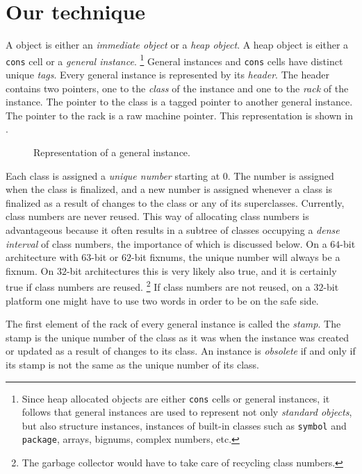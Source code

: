 \section{Our technique}

A \sicl{} object is either an \emph{immediate object} or a \emph{heap
  object}.  A heap object is either a \texttt{cons} cell or a
\emph{general instance}.%
\footnote{Since heap allocated objects are either \texttt{cons} cells
  or general instances, it follows that general instances are used to
  represent not only \emph{standard objects}, but also structure
  instances, instances of built-in classes such as \texttt{symbol} and
  \texttt{package}, arrays, bignums, complex numbers, etc.}
General instances and \texttt{cons} cells have
distinct unique \emph{tags}.  Every general instance is represented by
its \emph{header}.  The header contains two pointers, one to the
\emph{class} of the instance and one to the \emph{rack} of the
instance.  The pointer to the class is a tagged pointer to another
general instance.  The pointer to the rack is a raw machine pointer.
This representation is shown in .

\begin{figure}
\begin{center}
\end{center}
\caption{\label{fig-general-instance}
Representation of a general instance.}
\end{figure}

Each class is assigned a \emph{unique number} starting at $0$.  The
number is assigned when the class is finalized, and a new number is
assigned whenever a class is finalized as a result of changes to the
class or any of its superclasses.  Currently, class numbers are never
reused.  This way of allocating class numbers is advantageous because
it often results in a subtree of classes occupying a \emph{dense
  interval} of class numbers, the importance of which is discussed
below.  On a $64$-bit architecture with $63$-bit or $62$-bit fixnums,
the unique number will always be a fixnum.  On $32$-bit architectures
this is very likely also true, and it is certainly true if class
numbers are reused.%
\footnote{The garbage collector would have to take care of recycling
  class numbers.}  If class numbers are not reused, on a $32$-bit
platform one might have to use two words in order to be on the safe
side.

The first element of the rack of every general instance is called the
\emph{stamp}.  The stamp is the unique number of the class as it was
when the instance was created or updated as a result of changes to its
class.  An instance is \emph{obsolete} if and only if its stamp is not
the same as the unique number of its class.

